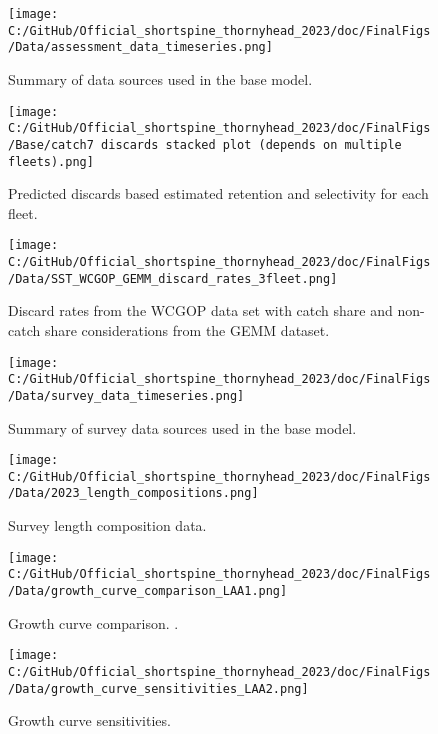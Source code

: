 \documentclass[11pt,
  english,
  letterpaper,
]{article}
\begin{document}
\begin{figure}
\centering
\texttt{[image: C:/GitHub/Official\_shortspine\_thornyhead\_2023/doc/FinalFigs/Data/assessment\_data\_timeseries.png]}
\caption{Summary of data sources used in the base model.\label{fig:assessment_data_timeseries}}
\end{figure}

\begin{figure}
\centering
\texttt{[image: C:/GitHub/Official\_shortspine\_thornyhead\_2023/doc/FinalFigs/Base/catch7 discards stacked plot (depends on multiple fleets).png]}
\caption{Predicted discards based estimated retention and selectivity for each fleet.\label{fig:disc_hist}}
\end{figure}

\begin{figure}
\centering
\texttt{[image: C:/GitHub/Official\_shortspine\_thornyhead\_2023/doc/FinalFigs/Data/SST\_WCGOP\_GEMM\_discard\_rates\_3fleet.png]}
\caption{Discard rates from the WCGOP data set with catch share and non-catch share considerations from the GEMM dataset.\label{fig:disc_rates_WCGOP}}
\end{figure}

\begin{figure}
\centering
\texttt{[image: C:/GitHub/Official\_shortspine\_thornyhead\_2023/doc/FinalFigs/Data/survey\_data\_timeseries.png]}
\caption{Summary of survey data sources used in the base model.\label{fig:survey_data_timeseries}}
\end{figure}

\begin{figure}
\centering
\texttt{[image: C:/GitHub/Official\_shortspine\_thornyhead\_2023/doc/FinalFigs/Data/2023\_length\_compositions.png]}
\caption{Survey length composition data.\label{fig:survey_comps}}
\end{figure}

\begin{figure}
\centering
\texttt{[image: C:/GitHub/Official\_shortspine\_thornyhead\_2023/doc/FinalFigs/Data/growth\_curve\_comparison\_LAA1.png]}
\caption{Growth curve comparison. .\label{fig:growth_LAA1}}
\end{figure}

\begin{figure}
\centering
\texttt{[image: C:/GitHub/Official\_shortspine\_thornyhead\_2023/doc/FinalFigs/Data/growth\_curve\_sensitivities\_LAA2.png]}
\caption{Growth curve sensitivities.\label{fig:growth_LAA2}}
\end{figure}
\end{document}
